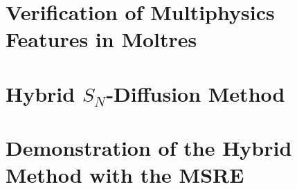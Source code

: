 \documentclass[11pt]{uiucthesis2021}
\newcounter{counterforappendices}
\begin{document}
\chapter{Verification of Multiphysics Features in Moltres}
\label{chap:verification}

\glsresetall

\chapter{Hybrid $S_N$-Diffusion Method}
\label{chap:hybrid}

\glsresetall

\chapter{Demonstration of the Hybrid Method with the MSRE}
\label{chap:msre}

\glsresetall

%

\backmatter

% 
\printbibliography[heading=bibintoc,title={References}]

\clearpage
\setcounter{counterforappendices}{\value{page}}
\mainmatter
\setcounter{page}{\value{counterforappendices}}
\appendix

\end{document}
